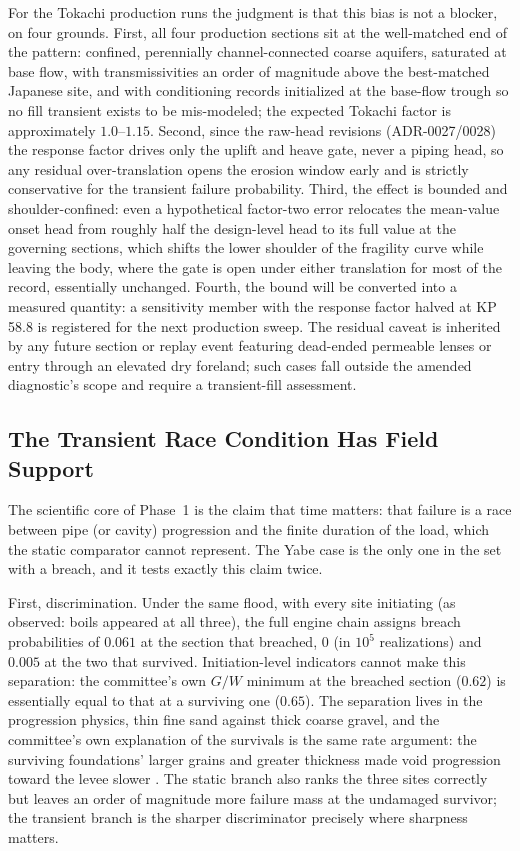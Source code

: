 For the Tokachi production runs the judgment is that this bias is not a
blocker, on four grounds. First, all four production sections sit at the
well-matched end of the pattern: confined, perennially channel-connected
coarse aquifers, saturated at base flow, with transmissivities an order of
magnitude above the best-matched Japanese site, and with conditioning
records initialized at the base-flow trough so no fill transient exists to
be mis-modeled; the expected Tokachi factor is approximately
$1.0$--$1.15$. Second, since the raw-head revisions (ADR-0027/0028) the
response factor drives only the uplift and heave gate, never a piping head,
so any residual over-translation opens the erosion window early and is
strictly conservative for the transient failure probability. Third, the
effect is bounded and shoulder-confined: even a hypothetical factor-two
error relocates the mean-value onset head from roughly half the design-level
head to its full value at the governing sections, which shifts the lower
shoulder of the fragility curve while leaving the body, where the gate is
open under either translation for most of the record, essentially unchanged.
Fourth, the bound will be converted into a measured quantity: a sensitivity
member with the response factor halved at KP\,58.8 is registered for the
next production sweep. The residual caveat is inherited by any future
section or replay event featuring dead-ended permeable lenses or entry
through an elevated dry foreland; such cases fall outside the amended
diagnostic's scope and require a transient-fill assessment.

\subsection{The Transient Race Condition Has Field Support}
\label{subsec: The Transient Race Condition Has Field Support}

The scientific core of Phase~1 is the claim that time matters: that failure
is a race between pipe (or cavity) progression and the finite duration of
the load, which the static comparator cannot represent. The Yabe case is the
only one in the set with a breach, and it tests exactly this claim twice.

First, discrimination. Under the same flood, with every site initiating (as
observed: boils appeared at all three), the full engine chain assigns breach
probabilities of $0.061$ at the section that breached, $0$ (in $10^5$
realizations) and $0.005$ at the two that survived. Initiation-level
indicators cannot make this separation: the committee's own $G/W$ minimum at
the breached section ($0.62$) is essentially equal to that at a surviving one
($0.65$). The separation lives in the progression physics, thin fine sand
against thick coarse gravel, and the committee's own explanation of the
survivals is the same rate argument: the surviving foundations' larger
grains and greater thickness made void progression toward the levee slower
\parencite{yabe_levee_committee_2013}. The static branch also ranks the
three sites correctly but leaves an order of magnitude more failure mass at
the undamaged survivor; the transient branch is the sharper discriminator
precisely where sharpness matters.

